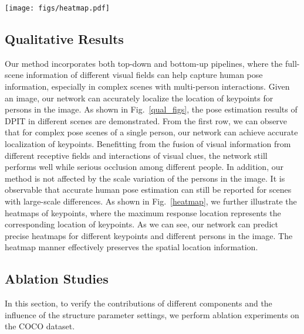 \documentclass[runningheads]{llncs}
\begin{document}
\begin{figure*}
  \texttt{[image: figs/heatmap.pdf]}
  \caption{Illustration of the heatmaps of all persons in the image predicted by the network. Each heatmap of the same row denotes the location response of different keypoints of one person. It can be observed that in the presence of different human distractions, our method can still accurately estimate the location of key points in the human body.}
  \label{heatmap}
\end{figure*}

\subsection{Qualitative Results}
Our method incorporates both top-down and bottom-up pipelines, where the full-scene information of different visual fields can help capture human pose information, especially in complex scenes with multi-person interactions. Given an image, our network can accurately localize the location of keypoints for persons in the image. As shown in Fig.~\ref{qual_figs}, the pose estimation results of DPIT in different scenes are demonstrated. From the first row, we can observe that for complex pose scenes of a single person, our network can achieve accurate localization of keypoints. Benefitting from the fusion of visual information from different receptive fields and interactions of visual clues, the network still performs well while serious occlusion among different people. In addition, our method is not affected by the scale variation of the persons in the image. It is observable that accurate human pose estimation can still be reported for scenes with large-scale differences. As shown in Fig.~\ref{heatmap}, we further illustrate the heatmaps of keypoints, where the maximum response location represents the corresponding location of keypoints. As we can see, our network can predict precise heatmaps for different keypoints and different persons in the image. The heatmap manner effectively preserves the spatial location information.

\subsection{Ablation Studies}
In this section, to verify the contributions of different components and the influence of the structure parameter settings, we perform ablation experiments on the COCO dataset.
\end{document}

